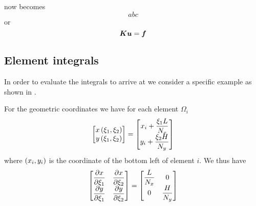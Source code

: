 now becomes
\begin{equation}
abc  
\end{equation}
or
\begin{equation}
  \matr{K}\vectr{u}=\vectr{f}
  \label{eqn:FEMTwoDLaplaceMatrixEquation}
\end{equation}

\subsection{Element integrals}
\label{subsec:FEMTwoDLaplaceElementIntegrals}

In order to evaluate the integrals to arrive at
 we consider a specific
example as shown in .


For the geometric coordinates we have for each element $\Omega_{i}$
\begin{equation}
  \begin{bmatrix}
     x\left( \xi_{1},\xi_{2} \right)  \\
     y\left( \xi_{1},\xi_{2} \right) 
  \end{bmatrix}= \begin{bmatrix}
    x_{i}+\dfrac{\xi_{1}L}{N_{x}} \\
    y_{i}+\dfrac{\xi_{2}H}{N_{y}}  
  \end{bmatrix}
\end{equation}
where $\left( x_{i},y_{i} \right)$ is the coordinate of the bottom left of element $i$. We thus have
\begin{equation}
  \begin{bmatrix}
     \dfrac{\partial x}{\partial \xi_{1}}  &  \dfrac{\partial x}{\partial \xi_{2}}  \\
     \dfrac{\partial y}{\partial \xi_{1}}  &  \dfrac{\partial y}{\partial \xi_{2}}      
  \end{bmatrix} = \begin{bmatrix}
    \dfrac{L}{N_{x}} & 0 \\
    0 & \dfrac{H}{N_{y}}
  \end{bmatrix}
\end{equation}

